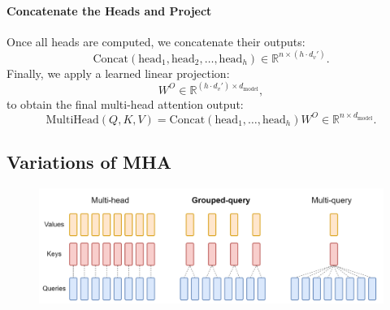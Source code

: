 \paragraph{Concatenate the Heads and Project}

   Once all heads are computed, we concatenate their outputs:
   \[
   \text{Concat}(\text{head}_1, \text{head}_2, \dots, \text{head}_h) \in \mathbb{R}^{n \times (h \cdot d_v')}.
   \]
   Finally, we apply a learned linear projection:
   \[
   W^O \in \mathbb{R}^{(h \cdot d_v') \times d_{\text{model}}},
   \]
   to obtain the final multi-head attention output:
   \[
   \text{MultiHead}(Q, K, V) = \text{Concat}(\text{head}_1, \dots, \text{head}_h) W^O \in \mathbb{R}^{n \times d_{\text{model}}}.
   \]



\subsection{Variations of MHA}

\begin{figure}[t]
	\centering
	\includegraphics[scale=0.5]{./images/transformer/multi_head_attention.png}
\end{figure}

